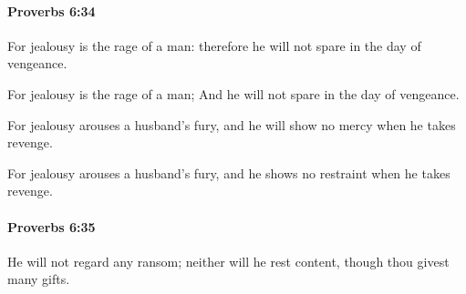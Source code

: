 		\paragraph{Proverbs 6:34} %
			\label{PROVERBS-6-34}

			For jealousy is the rage of a man: therefore he will not spare in the day of vengeance.

			\begin{versebox}
					\item[BHS] 
					\item[ASV] For jealousy is the rage of a man; And he will not spare in the day of vengeance.
					\item[NIV] For jealousy arouses a husband’s fury, and he will show no mercy when he takes revenge.
					\item[NRSV] For jealousy arouses a husband’s fury, and he shows no restraint when he takes revenge.
			\end{versebox}

		\paragraph{Proverbs 6:35} %
			\label{PROVERBS-6-35}

			He will not regard any ransom; neither will he rest content, though thou givest many gifts.


